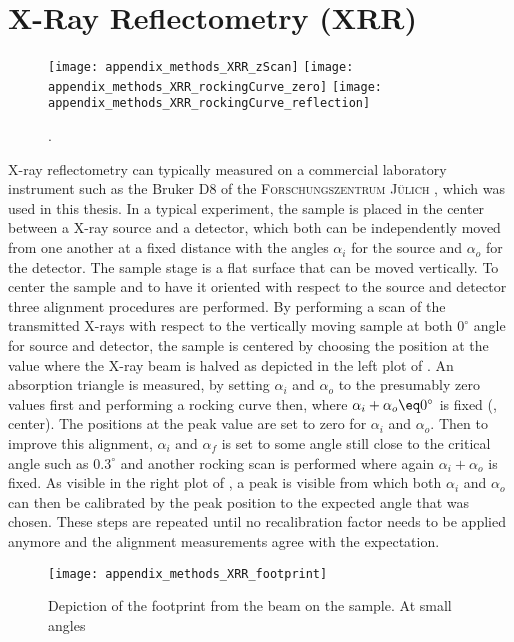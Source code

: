 \documentclass[\main/dresen_thesis.tex]{subfiles}
\begin{document}
  \section{X-Ray Reflectometry (XRR)}
    \label{ch:methods:xrr}
    \begin{figure}[tb]
      \centering
      \texttt{[image: appendix\_methods\_XRR\_zScan]}
      \texttt{[image: appendix\_methods\_XRR\_rockingCurve\_zero]}
      \texttt{[image: appendix\_methods\_XRR\_rockingCurve\_reflection]}
      \caption{\label{fig:methods:xrr:alignment}.}
    \end{figure}

    X-ray reflectometry can typically measured on a commercial laboratory instrument such as the Bruker D8 of the \textsc{Forschungszentrum J\"ulich} , which was used in this thesis.
    In a typical experiment, the sample is placed in the center between a X-ray source and a detector, which both can be independently moved from one another at a fixed distance with the angles $\alpha_i$ for the source and $\alpha_o$ for the detector.
    The sample stage is a flat surface that can be moved vertically.
    To center the sample and to have it oriented with respect to the source and detector three alignment procedures are performed.
    By performing a scan of the transmitted X-rays with respect to the vertically moving sample at both $0^\circ$ angle for source and detector, the sample is centered by choosing the position at the value where the X-ray beam is halved as depicted in the left plot of .
    An absorption triangle is measured, by setting $\alpha_i$ and $\alpha_o$ to the presumably zero values first and performing a rocking curve then, where $\alpha_i + \alpha_o \eq 0^\circ$ is fixed (, center).
    The positions at the peak value are set to zero for $\alpha_i$ and $\alpha_o$.
    Then to improve this alignment, $\alpha_i$ and $\alpha_f$ is set to some angle still close to the critical angle such as $0.3^\circ$ and another rocking scan is performed where again $\alpha_i + \alpha_o$ is fixed.
    As visible in the right plot of , a peak is visible from which both $\alpha_i$ and $\alpha_o$ can then be calibrated by the peak position to the expected angle that was chosen.
    These steps are repeated until no recalibration factor needs to be applied anymore and the alignment measurements agree with the expectation.

    \begin{figure}[tb]
      \centering
      \texttt{[image: appendix\_methods\_XRR\_footprint]}
      \caption{\label{fig:methods:xrr:footprint}Depiction of the footprint from the beam on the sample. At small angles }
    \end{figure}
\end{document}
